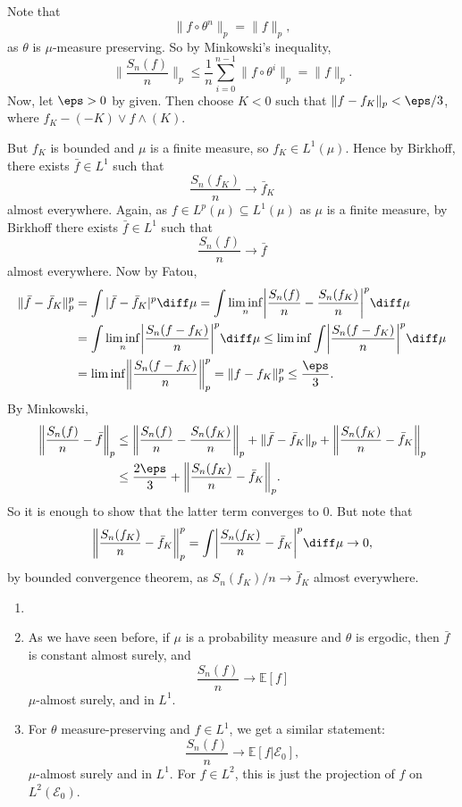 \documentclass[12pt]{article}
\begin{document}
\begin{proofbox}
	Note that
	\[
	\|f \circ \theta^{n}\|_p = \|f\|_p,
	\]
	as $\theta$ is $\mu$-measure preserving. So by Minkowski's inequality,
	\[
	\biggl\|\frac{S_n(f)}{n}\biggr\|_p \leq \frac{1}{n} \sum_{i = 0}^{n-1} \|f \circ \theta^i\|_p = \|f\|_p.
	\]
	Now, let $\eps > 0$ by given. Then choose $K < 0$ such that $\|f - f_K\|_p < \eps/3$, where $f_K - (-K) \vee f \wedge (K)$.

	But $f_K$ is bounded and $\mu$ is a finite measure, so $f_K \in L^1(\mu)$. Hence by Birkhoff, there exists $\bar f \in L^1$ such that
	\[
	\frac{S_n(f_K)}{n} \to \bar f_K
	\]
	almost everywhere. Again, as $f \in L^p(\mu) \subseteq L^1(\mu)$ as $\mu$ is a finite measure, by Birkhoff there exists $\bar f \in L^1$ such that
	\[
	\frac{S_n(f)}{n} \to \bar f
	\]
	almost everywhere. Now by Fatou,
	\begin{align*}
		\|\bar f - \bar f_K\|_p^p &= \int |\bar f - \bar f_K|^p \diff \mu = \int \liminf_n \biggl| \frac{S_n(f)}{n} - \frac{S_n(f_K)}{n} \biggr|^p \diff \mu \\
					  &= \int \liminf_n \biggl| \frac{S_n(f - f_K)}{n} \biggr|^p \diff \mu \leq \liminf \int \biggl| \frac{S_n(f - f_K)}{n} \biggr|^p \diff \mu \\
					  &= \liminf \biggl\|\frac{S_n(f - f_K)}{n}\biggr\|_p^p = \|f - f_K\|_p^p \leq \frac{\eps}{3}.
	\end{align*}
	By Minkowski,
	\begin{align*}
		\biggl\|\frac{S_n(f)}{n} - \bar f\biggr\|_p &\leq \biggl\|\frac{S_n(f)}{n} - \frac{S_n(f_K)}{n}\biggr\|_p + \|\bar f - \bar f_K\|_p + \biggl\|\frac{S_n(f_K)}{n} - \bar f_K\biggr\|_p \\
							    &\leq \frac{2\eps}{3} + \biggl\|\frac{S_n(f_K)}{n} - \bar f_K\biggr\|_p.
	\end{align*}
	So it is enough to show that the latter term converges to $0$. But note that
	\begin{align*}
		\biggl\|\frac{S_n(f_K)}{n} - \bar f_K\biggr\|_p^p = \int \biggl|\frac{S_n(f_K)}{n} - \bar f_K \biggr|^p \diff \mu \to 0,
	\end{align*}
	by bounded convergence theorem, as $S_n(f_K)/n \to \bar f_K$ almost everywhere.
\end{proofbox}


\begin{remark}
	\begin{enumerate}
		\item[]
		\item As we have seen before, if $\mu$ is a probability measure and $\theta$ is ergodic, then $\bar f$ is constant almost surely, and
			\[
			\frac{S_n(f)}{n} \to \mathbb{E}[f]
			\]
			$\mu$-almost surely, and in $L^1$.
		\item For $\theta$ measure-preserving and $f \in L^1$, we get a similar statement:
			\[
			\frac{S_n(f)}{n} \to \mathbb{E}[f|\mathcal{E}_0],
			\]
			$\mu$-almost surely and in $L^1$. For $f \in L^2$, this is just the projection of $f$ on $L^2(\mathcal{E}_0)$.
	\end{enumerate}
\end{remark}
\end{document}
